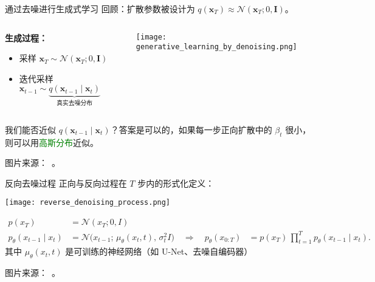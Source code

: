 \begin{refsection}
\begin{frame}{通过去噪进行生成式学习}
  回顾：扩散参数被设计为 $q(\mathbf{x}_T) \approx \mathcal{N}(\mathbf{x}_T; 0, \mathbf{I})$。
  \begin{columns}
    \begin{column}{0.4\textwidth}
      \textbf{生成过程：}
      \begin{itemize}
        \item 采样 $\mathbf{x}_T \sim \mathcal{N}(\mathbf{x}_T; 0, \mathbf{I})$
        \item 迭代采样 $\mathbf{x}_{t-1} \sim \underbrace{q(\mathbf{x}_{t-1} \mid \mathbf{x}_t)}_{\text{真实去噪分布}}$
      \end{itemize}
    \end{column}
    \begin{column}{0.6\textwidth}
      \centering
      \texttt{[image: generative\_learning\_by\_denoising.png]}
    \end{column}
  \end{columns}
  我们能否近似 $q(\mathbf{x}_{t-1} \mid \mathbf{x}_t)$？答案是可以的，如果每一步正向扩散中的 $\beta_t$ 很小，则可以用\textcolor{green}{高斯分布}近似。

  \scriptsize 图片来源：~\cite{CVPR2023Tutorial}。
  \bottomleftrefs
\end{frame}
\end{refsection}

\begin{refsection}
\begin{frame}{反向去噪过程}
  正向与反向过程在 $T$ 步内的形式化定义：
  \begin{center}
    \texttt{[image: reverse\_denoising\_process.png]}
  \end{center}
  \vspace{-2em}
  \begin{align*}
    p(x_T) &= \mathcal{N}(x_T; 0, I) \\
    p_\theta(x_{t-1}\mid x_t)
    &= \mathcal{N}\bigl(x_{t-1};\,\mu_\theta(x_t, t),\,\sigma_t^2 I\bigr)\quad
    \Rightarrow\quad
    p_\theta(x_{0:T})
    &= p(x_T)\,\prod_{t=1}^T p_\theta(x_{t-1}\mid x_t).
  \end{align*}
    \scriptsize
    其中 $\mu_\theta(x_t, t)$ 是可训练的神经网络（如 U-Net、去噪自编码器）

    \scriptsize 图片来源：~\cite{CVPR2023Tutorial}。
    \bottomleftrefs
\end{frame}
\end{refsection}

